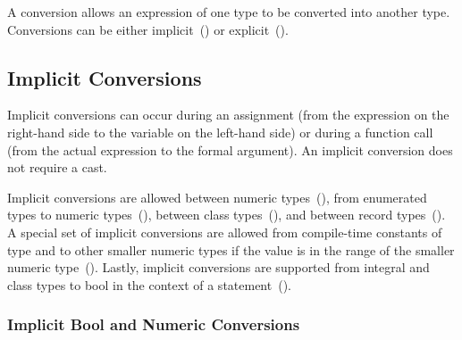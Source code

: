 \label{Conversions}

A conversion allows an expression of one type to be converted into
another type.  Conversions can be either
implicit~() or
explicit~().

\subsection{Implicit Conversions}
\label{Implicit_Conversions}

Implicit conversions can occur during an assignment (from the
expression on the right-hand side to the variable on the left-hand
side) or during a function call (from the actual expression to the
formal argument).  An implicit conversion does not require a cast.

Implicit conversions are allowed between numeric
types~(), from enumerated types to
numeric types~(), between class
types~(), and between record
types~().  A special set of implicit
conversions are allowed from compile-time constants of type 
and  to other smaller numeric types if the value is in
the range of the smaller numeric
type~().  Lastly,
implicit conversions are supported from integral and class types to
bool in the context of a
statement~().

\subsubsection{Implicit Bool and Numeric Conversions}
\label{Implicit_Numeric_Conversions}

